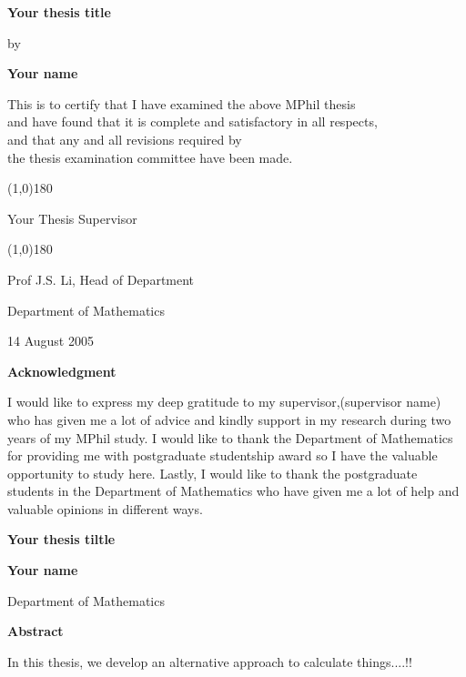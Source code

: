 \null\vspace{1.0cm}
\begin{center}
{\Large\bf Your thesis title}
\vspace{1.5cm}

{\large by}\smallskip

{\large\bf Your name}\normalsize

\vspace{1cm}

This is to certify that I have examined the above MPhil thesis \\
and have found that it is complete and satisfactory in all respects, \\
and that any and all revisions required by \\
the thesis examination committee have been made.

\vspace{2.0cm}


\line(1,0){180} \smallskip

Your Thesis Supervisor
\vspace{1.5cm}

\line(1,0){180} \smallskip

Prof J.S. Li, Head of Department
\medskip

Department of Mathematics\medskip

14 August 2005
\end{center}

\newpage

\begin{center}{\Large\bf Acknowledgment}\normalsize
\end{center}
\vspace{0.5cm}

I would like to express my deep gratitude to my supervisor,(supervisor name) 
who has given me a lot of advice and kindly support in my research during two years of my MPhil study. 
I would like to thank the Department of Mathematics for
providing me with postgraduate studentship award so I have the valuable opportunity to study here. Lastly, I would like to thank the postgraduate students in
the Department of Mathematics who have given me a lot of help and valuable opinions in different
ways.

\newpage
{}
\tableofcontents
\listoffigures
\listoftables

\newpage
{}
\begin{center}
{\Large\bf Your thesis tiltle}
\vspace{0.5cm}

{\large \bf Your name}\normalsize

\medskip

Department of Mathematics

\end{center}
\vspace{1.5cm}
\centerline{{\bf \large Abstract}}
\vspace{1.5cm}

In this thesis, we develop an alternative approach to calculate things....!!
